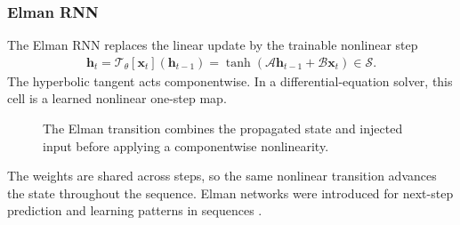 \documentclass[11pt]{article}
\begin{document}
\subsubsection{Elman RNN}
The Elman RNN replaces the linear update by the trainable nonlinear step
\begin{equation}
  \begin{split}
  \bm{h}_t
  =\mathcal T_\theta[\bm{x}_t](\bm{h}_{t-1})
  =\tanh\!\left(
    \mathcal A\bm{h}_{t-1}+\mathcal B\bm{x}_t
  \right)\in\mathcal S.
  \label{eq:elman-cell}
  \end{split}
\end{equation}
The hyperbolic tangent acts componentwise.  In a differential-equation solver,
this cell is a learned nonlinear one-step map.
\begin{figure}[H]
\centering
{}
\caption{The Elman transition combines the propagated state and injected input
before applying a componentwise nonlinearity.}
\label{fig:elman-cell}
\end{figure}
The weights are shared across steps, so the same nonlinear transition advances
the state throughout the sequence.  Elman networks were introduced for
next-step prediction and learning patterns in sequences
\citep{elman1990finding}.
\end{document}

